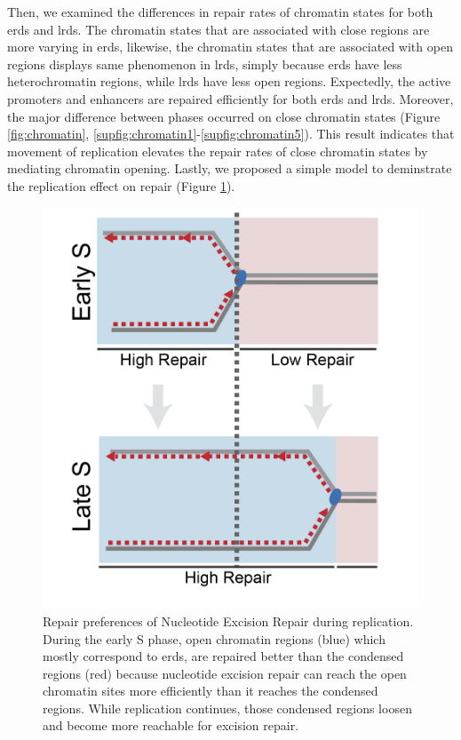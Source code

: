 Then, we examined the differences in repair rates of chromatin states for both \gls{erd}s and \gls{lrd}s. The chromatin states that are associated with close regions are more varying in \gls{erd}s, likewise, the chromatin states that are associated with open regions displays same phenomenon in \gls{lrd}s, simply because \gls{erd}s have less heterochromatin regions, while \gls{lrd}s have less open regions. Expectedly, the active promoters and enhancers are repaired efficiently for both \gls{erd}s and \gls{lrd}s. Moreover, the major difference between phases occurred on close chromatin states (Figure \ref{fig:chromatin}, \ref{supfig:chromatin1}-\ref{supfig:chromatin5}). This result indicates that movement of replication elevates the repair rates of close chromatin states by mediating chromatin opening. Lastly, we proposed a simple model to deminstrate the replication effect on repair (Figure \ref{fig:model}).     

\begin{figure}[H]
    \begin{center}
    \includegraphics[width=0.8\columnwidth]{Chapters/5_discussion/figures/model}
    \caption[Repair preferences of Nucleotide Excision Repair during replication.]{Repair preferences of Nucleotide Excision Repair during replication. During the early S phase, open chromatin regions (blue) which mostly correspond to \gls{erd}s, are repaired better than the condensed regions (red) because nucleotide excision repair can reach the open chromatin sites more efficiently than it reaches the condensed regions. While replication continues, those condensed regions loosen and become more reachable for excision repair.}
    \label{fig:model}
    \end{center}
    \end{figure}

